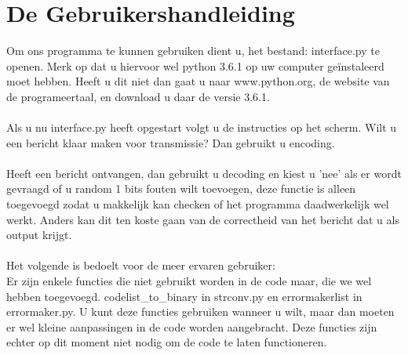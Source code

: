 \documentclass[a4paper]{article}
\begin{document}
\section{De Gebruikershandleiding}
Om ons programma te kunnen gebruiken dient u, het bestand: interface.py te openen. Merk op dat u hiervoor wel python 3.6.1 op uw computer ge\"instaleerd moet hebben. Heeft u dit niet dan gaat u naar www.python.org, de website van de programeertaal, en download u daar de versie 3.6.1.\\
\\
Als u nu interface.py heeft opgestart volgt u de instructies op het scherm. Wilt u een bericht klaar maken voor transmissie? Dan gebruikt u encoding.\\
\\
Heeft een bericht ontvangen, dan gebruikt u decoding en kiest u 'nee' als er wordt gevraagd of u random 1 bits fouten wilt toevoegen, deze functie is alleen toegevoegd zodat u makkelijk kan checken of het programma daadwerkelijk wel werkt. Anders kan dit ten koste gaan van de correctheid van het bericht dat u als output krijgt.\\
\\
Het volgende is bedoelt voor de meer ervaren gebruiker:\\
Er zijn enkele functies die niet gebruikt worden in de code maar, die we wel hebben toegevoegd. codelist\_to\_binary in strconv.py en errormakerlist in errormaker.py. U kunt deze functies gebruiken wanneer u wilt, maar dan moeten er wel kleine aanpassingen in de code worden aangebracht. Deze functies zijn echter op dit moment niet nodig om de code te laten functioneren.
\end{document}
